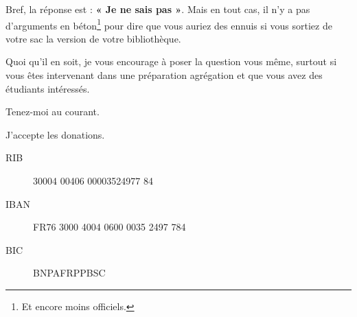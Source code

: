 Bref, la réponse est : \textbf{« Je ne sais pas »}. Mais en tout cas, il n'y a pas d'arguments en béton\footnote{Et encore moins officiels.} pour dire que vous auriez des ennuis si vous sortiez de votre sac la version de votre bibliothèque.

Quoi qu'il en soit, je vous encourage à poser la question vous même, surtout si vous êtes intervenant dans une préparation agrégation et que vous avez des étudiants intéressés.

Tenez-moi au courant. 

\vfill

J'accepte les donations.
\begin{description}
\item[RIB] 30004 00406 00003524977 84
\item[IBAN] FR76 3000 4004 0600 0035 2497 784
\item[BIC] BNPAFRPPBSC
\end{description}
